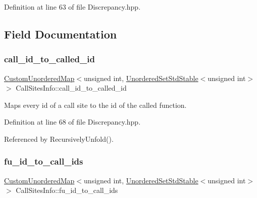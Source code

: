 Definition at line 63 of file Discrepancy.\+hpp.



\subsection{Field Documentation}
\mbox{\label{structCallSitesInfo_ad530622005380528de3c3672d3ada8ec}} 
\subsubsection{\texorpdfstring{call\+\_\+id\+\_\+to\+\_\+called\+\_\+id}{call\_id\_to\_called\_id}}
{\footnotesize\ttfamily \hyperlink{custom__map_8hpp_ad1ed68f2ff093683ab1a33522b144adc}{Custom\+Unordered\+Map}$<$unsigned int, \hyperlink{custom__set_8hpp_a1f63d303cef2790dc0a0ff7feae38f83}{Unordered\+Set\+Std\+Stable}$<$unsigned int$>$ $>$ Call\+Sites\+Info\+::call\+\_\+id\+\_\+to\+\_\+called\+\_\+id}



Maps every id of a call site to the id of the called function. 



Definition at line 68 of file Discrepancy.\+hpp.



Referenced by Recursively\+Unfold().

\mbox{\label{structCallSitesInfo_a7496639281820e49c60d12578adc79eb}} 
\subsubsection{\texorpdfstring{fu\+\_\+id\+\_\+to\+\_\+call\+\_\+ids}{fu\_id\_to\_call\_ids}}
{\footnotesize\ttfamily \hyperlink{custom__map_8hpp_ad1ed68f2ff093683ab1a33522b144adc}{Custom\+Unordered\+Map}$<$unsigned int, \hyperlink{custom__set_8hpp_a1f63d303cef2790dc0a0ff7feae38f83}{Unordered\+Set\+Std\+Stable}$<$unsigned int$>$ $>$ Call\+Sites\+Info\+::fu\+\_\+id\+\_\+to\+\_\+call\+\_\+ids}



